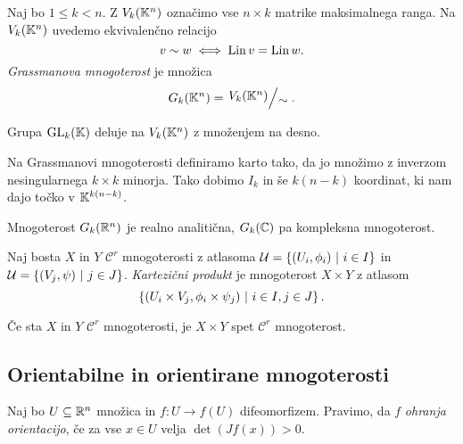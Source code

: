 
\begin{definicija}
Naj bo $1 \leq k < n$. Z $V_k(\mathbb{K}^n)$ označimo vse $n \times k$
matrike maksimalnega ranga. Na $V_k(\mathbb{K}^n)$ uvedemo ekvivalenčno
relacijo
\[
v \sim w \iff \operatorname{Lin} v = \operatorname{Lin} w.
\]
\emph{Grassmanova mnogoterost} je
množica
\[
G_k(\K^n) = \kvoc{V_k(\K^n)}{\sim}.
\]
\end{definicija}

\begin{opomba}
Grupa $\operatorname{GL}_k(\mathbb{K})$ deluje na $V_k(\mathbb{K}^n)$ z množenjem na desno.
\end{opomba}

\begin{opomba}
Na Grassmanovi mnogoterosti definiramo karto tako, da jo množimo z
inverzom nesingularnega $k \times k$ minorja. Tako dobimo $I_k$ in
še $k(n-k)$ koordinat, ki nam dajo točko v $\mathbb{K}^{k(n-k)}$.
\end{opomba}

\begin{opomba}
Mnogoterost $G_k(\mathbb{R}^n)$ je realno analitična, $G_k(\mathbb{C})$ pa
kompleksna mnogoterost.
\end{opomba}

\begin{definicija}
Naj bosta $X$ in $Y$ $\mathcal{C}^r$ mnogoterosti z atlasoma
$\mathcal{U} = \left\{(U_i, \phi_i)~\middle\vert~i \in I\right\}$ in
$\mathcal{U} = \left\{(V_j, \psi)~\middle\vert~j \in J\right\}$.
\emph{Kartezični produkt} je
mnogoterost $X \times Y$ z atlasom
\[
\left\{(U_i \times V_j, \phi_i \times \psi_j)~\middle\vert~i \in I, j \in J\right\}.
\]
\end{definicija}

\begin{opomba}
Če sta $X$ in $Y$ $\mathcal{C}^r$ mnogoterosti, je $X \times Y$
spet $\mathcal{C}^r$ mnogoterost.
\end{opomba}

\newpage

\subsection{Orientabilne in orientirane mnogoterosti}

\begin{definicija}
Naj bo $U \subseteq \mathbb{R}^n$ množica in $f \colon U \to f(U)$
difeomorfizem. Pravimo, da $f$ \emph{ohranja orientacijo}, če za
vse $x \in U$ velja $\det(Jf(x)) > 0$.
\end{definicija}

